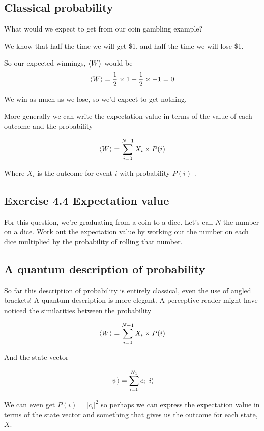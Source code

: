 \documentclass{book}
\begin{document}
\subsection{ Classical probability }

What would we expect to get from our coin gambling example? 

We know that half the time we will get \$1, and half the time we will lose \$1. 

So our expected winnings, $\braket{W}$ would be
$$
\braket{W} = \frac{1}{2} \times 1 + \frac{1}{2} \times -1 
=0
$$

We win as much as we lose, so we'd expect to get nothing. 

More generally we can write the expectation value in terms of the value of each outcome and the probability 

$$ \braket{W} = \sum_{i = 0}^{N-1} X_i \times P(i) $$

Where $X_i$ is the outcome for event $i$ with probability $P(i)$ . 

 
\subsection{Exercise 4.4 Expectation value}  
  
For this question, we're graduating from a coin to a dice. Let's call $N$ the number on a dice. Work out the expectation value by working out the number on each dice multiplied by the probability of rolling that number. \newline



\subsection{ A quantum description of probability }

So far this description of probability is entirely classical, even the use of angled brackets! A quantum description is more elegant. A perceptive reader might have noticed the similarities between the probability

$$ \braket{W} = \sum_{i = 0}^{N-1} X_i \times P(i) $$

And the state vector

$$
\ket{\psi} = \sum_{i = 0}^{N_1} c_i \ket{i}
$$ 

We can even get $P(i) = |c_i|^2$ so perhaps we can express the expectation value in terms of the state vector and something that gives us the outcome for each state,$X$. 
\end{document}

